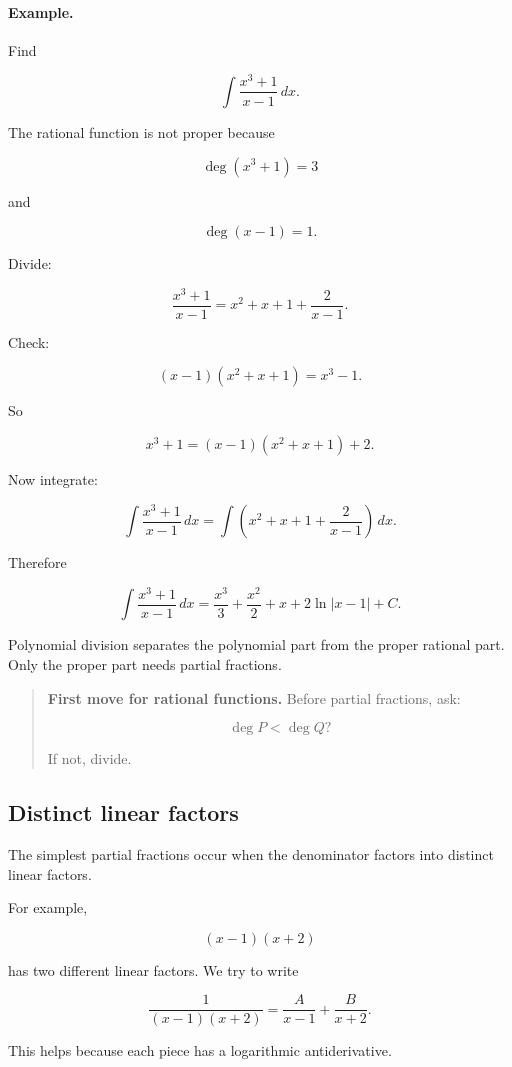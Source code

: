 \paragraph{Example.}
Find

\[
\int \frac{x^3+1}{x-1}\,dx.
\]

The rational function is not proper because

\[
\deg(x^3+1)=3
\]

and

\[
\deg(x-1)=1.
\]

Divide:

\[
\frac{x^3+1}{x-1}
=
x^2+x+1+\frac{2}{x-1}.
\]

Check:

\[
(x-1)(x^2+x+1)=x^3-1.
\]

So

\[
x^3+1=(x-1)(x^2+x+1)+2.
\]

Now integrate:

\[
\int \frac{x^3+1}{x-1}\,dx
=
\int\left(x^2+x+1+\frac{2}{x-1}\right)\,dx.
\]

Therefore

\[
\boxed{
\int \frac{x^3+1}{x-1}\,dx
=
\frac{x^3}{3}+\frac{x^2}{2}+x+2\ln|x-1|+C.
}
\]

Polynomial division separates the polynomial part from the proper rational part.  Only
the proper part needs partial fractions.

\begin{quote}
\textbf{First move for rational functions.}
Before partial fractions, ask:

\[
\deg P<\deg Q?
\]

If not, divide.
\end{quote}

\subsection{Distinct linear factors}
\label{subsec:distinct-linear-factors}

The simplest partial fractions occur when the denominator factors into distinct linear
factors.

For example,

\[
(x-1)(x+2)
\]

has two different linear factors.  We try to write

\[
\frac{1}{(x-1)(x+2)}
=
\frac{A}{x-1}+\frac{B}{x+2}.
\]

This helps because each piece has a logarithmic antiderivative.

